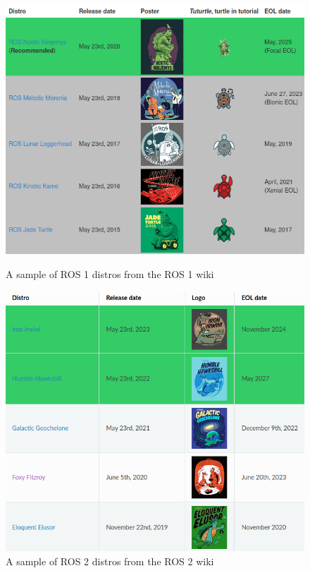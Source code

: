 \documentclass[titlepage, draft]{article}
\begin{document}
{\begin{figure}[H]
	\centering
	\begin{minipage}{.45\textwidth}
		\centering
		\includegraphics[width=\linewidth]{ROS1Distros.png}
		\caption{A sample of ROS 1 distros from the ROS 1 wiki \cite{ROS1Distros}}
		\label{fig:ros1distros}
	\end{minipage}%
	\hspace{0.1\textwidth}%
	\begin{minipage}{.45\textwidth}
		\centering
		\includegraphics[width=\linewidth]{ROS2Distros.png}
		\caption{A sample of ROS 2 distros from the ROS 2 wiki \cite{ROS2Distros}}
		\label{fig:ros2distros}
	\end{minipage}
\end{figure}

}
\end{document}
